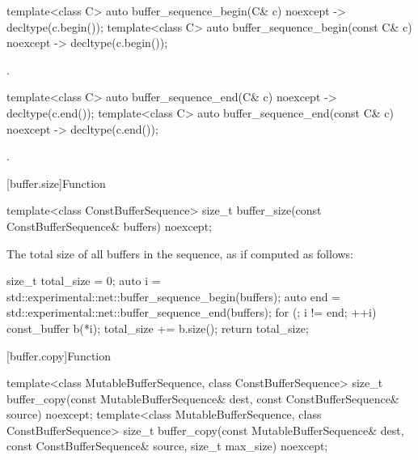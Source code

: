 %
\begin{itemdecl}
template<class C> auto buffer_sequence_begin(C& c) noexcept -> decltype(c.begin());
template<class C> auto buffer_sequence_begin(const C& c) noexcept -> decltype(c.begin());
\end{itemdecl}

\begin{itemdescr}
\pnum
\returns {}.
\end{itemdescr}

%
\begin{itemdecl}
template<class C> auto buffer_sequence_end(C& c) noexcept -> decltype(c.end());
template<class C> auto buffer_sequence_end(const C& c) noexcept -> decltype(c.end());
\end{itemdecl}

\begin{itemdescr}
\pnum
\returns {}.
\end{itemdescr}



[buffer.size]{Function }

%
\begin{itemdecl}
template<class ConstBufferSequence>
  size_t buffer_size(const ConstBufferSequence& buffers) noexcept;
\end{itemdecl}

\begin{itemdescr}
\pnum
\returns The total size of all buffers in the sequence, as if computed as follows:
\begin{codeblock}
size_t total_size = 0;
auto i = std::experimental::net::buffer_sequence_begin(buffers);
auto end = std::experimental::net::buffer_sequence_end(buffers);
for (; i != end; ++i)
{
  const_buffer b(*i);
  total_size += b.size();
}
return total_size;
\end{codeblock}

\end{itemdescr}



[buffer.copy]{Function }

%
\begin{itemdecl}
template<class MutableBufferSequence, class ConstBufferSequence>
  size_t buffer_copy(const MutableBufferSequence& dest,
                     const ConstBufferSequence& source) noexcept;
template<class MutableBufferSequence, class ConstBufferSequence>
  size_t buffer_copy(const MutableBufferSequence& dest,
                     const ConstBufferSequence& source,
                     size_t max_size) noexcept;
\end{itemdecl}

